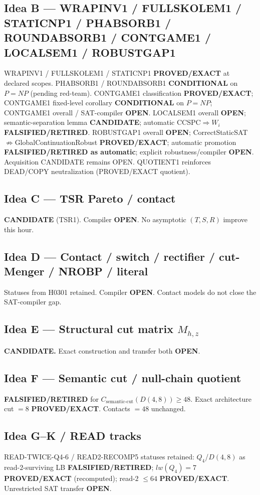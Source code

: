 \documentclass[11pt]{article}
\begin{document}
\subsection*{Idea B --- WRAPINV1 / FULLSKOLEM1 / STATICNP1 / PHABSORB1 / ROUNDABSORB1 / CONTGAME1 / LOCALSEM1 / ROBUSTGAP1}
WRAPINV1 / FULLSKOLEM1 / STATICNP1 \textbf{PROVED/EXACT} at declared scopes.
PHABSORB1 / ROUNDABSORB1 \textbf{CONDITIONAL} on $P=NP$ (pending red-team).
CONTGAME1 classification \textbf{PROVED/EXACT}; CONTGAME1 fixed-level corollary
\textbf{CONDITIONAL} on $P=NP$; CONTGAME1 overall / SAT-compiler \textbf{OPEN}.
LOCALSEM1 overall \textbf{OPEN}; semantic-separation lemma \textbf{CANDIDATE};
automatic CCSPC$\Rightarrow W_i$ \textbf{FALSIFIED/RETIRED}.
ROBUSTGAP1 overall \textbf{OPEN}; CorrectStaticSAT$\not\Rightarrow$GlobalContinuationRobust
\textbf{PROVED/EXACT}; automatic promotion \textbf{FALSIFIED/RETIRED as automatic};
explicit robustness/compiler \textbf{OPEN}.
Acquisition CANDIDATE remains OPEN.
QUOTIENT1 reinforces DEAD/COPY neutralization (PROVED/EXACT quotient).

\subsection*{Idea C --- TSR Pareto / contact}
\textbf{CANDIDATE} (TSR1). Compiler \textbf{OPEN}. No asymptotic $(T,S,R)$ improve this hour.

\subsection*{Idea D --- Contact / switch / rectifier / cut-Menger / NROBP / literal}
Statuses from H0301 retained. Compiler \textbf{OPEN}. Contact models do not close the SAT-compiler gap.

\subsection*{Idea E --- Structural cut matrix $M_{h,z}$}
\textbf{CANDIDATE.} Exact construction and transfer both \textbf{OPEN}.

\subsection*{Idea F --- Semantic cut / null-chain quotient}
\textbf{FALSIFIED/RETIRED} for $C_{\mathrm{semantic\textrm{-}cut}}(D(4,8))\ge48$.
Exact architecture cut $=8$ \textbf{PROVED/EXACT}. Contacts $=48$ unchanged.

\subsection*{Idea G--K / READ tracks}
READ-TWICE-Q4-6 / READ2-RECOMP5 statuses retained: $Q_4$/$D(4,8)$ as read-$2$-surviving LB
\textbf{FALSIFIED/RETIRED}; $lw(Q_4)=7$ \textbf{PROVED/EXACT} (recomputed); read-$2$ $\le64$
\textbf{PROVED/EXACT}. Unrestricted SAT transfer \textbf{OPEN}.
\end{document}
